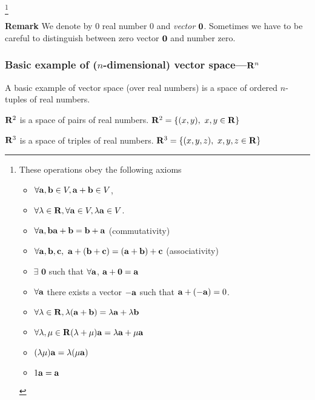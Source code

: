 \documentclass[12pt]{article}
\numberwithin{equation}{section}
\begin{document}
\footnote{ These
operations obey the following axioms


\begin{itemize}
 \item  $\forall {\bf a},{\bf b}\in V, {\bf a}+{\bf b}\in V$,

 \item $\forall \lambda\in {\bf R}, \forall {\bf a}\in V, \lambda {\bf a}\in V$.

\item
  $\forall {\bf a},{\bf b} {\bf a}+{\bf b}={\bf b}+{\bf a}$  (commutativity)
\item
$\forall {\bf a},{\bf b},{\bf c}, \,\,{\bf a}+({\bf b}+{\bf c})=({\bf a}+{\bf b})+{\bf c}$ (associativity)

\item  $\exists\,\, {\mathbf 0}$ such that $\forall {\bf a}$,
 ${\bf a}+{\mathbf 0}={\bf a}$

\item  $\forall {\bf a}$ there exists a vector $-{\bf a}$ such that ${\bf a}+(-{\bf a})=0$.

\item

  $\forall\lambda\in {\bf R}, \lambda({\bf a}+{\bf b})=\lambda {\bf a}+\lambda {\bf b}$

  \item

    $\forall\lambda,\mu\in {\bf R} (\lambda+\mu){\bf a}=\lambda{\bf a}+\mu{\bf a}$

    \item $(\lambda\mu){\bf a}=\lambda(\mu{\bf a})$

    \item $1{\bf a}={\bf a}$

\end{itemize}
}

\smallskip

{\bf Remark} We denote by $0$ real number  $0$ and {\it vector }
$\bf 0$. Sometimes we have to be careful to distinguish
between zero  vector $\bf 0$ and number zero.

\smallskip


\subsubsection {Basic example of ($n$-dimensional) vector space---${\bf R}^n$}

 A basic example of vector space (over real numbers) is a space
  of ordered $n$-tuples of real numbers.


\noindent  ${\bf R}^2$ is a space of pairs of real numbers. ${\bf R}^2=\{(x,y),\,\,x,y\in {\bf R} \}$

\noindent    ${\bf R}^3$ is a space of triples  of real numbers. ${\bf R}^3=\{(x,y,z),\,\,x,y,z\in {\bf R} \}$
\end{document}
